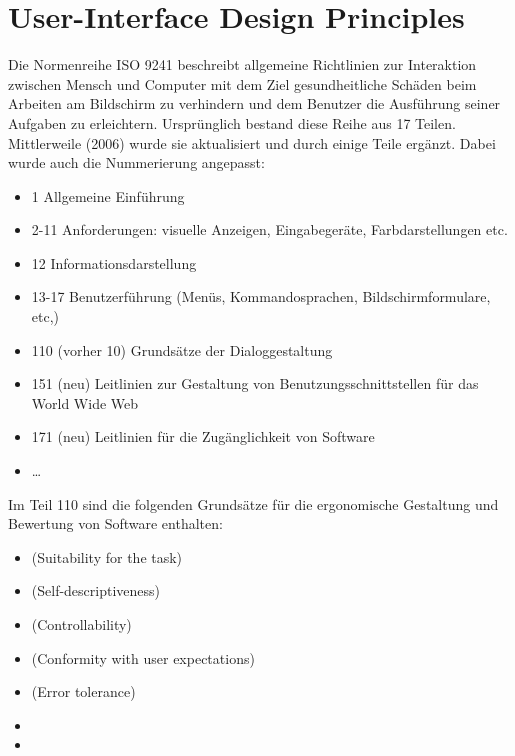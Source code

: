 \section{User-Interface Design Principles}
Die Normenreihe ISO 9241 beschreibt allgemeine Richtlinien zur Interaktion zwischen
Mensch und Computer mit dem Ziel gesundheitliche Schäden beim Arbeiten am
Bildschirm zu verhindern und dem Benutzer die Ausführung seiner Aufgaben zu
erleichtern. Ursprünglich bestand diese Reihe aus 17
Teilen. Mittlerweile (2006) wurde sie aktualisiert und durch einige
Teile ergänzt.
\newslide
Dabei wurde auch die Nummerierung angepasst:
\begin{itemize}
\item 1 Allgemeine Einführung
\item 2-11 Anforderungen: visuelle Anzeigen, Eingabegeräte,
  Farbdarstellungen etc.
\item 12 Informationsdarstellung
\item 13-17 Benutzerführung (Menüs, Kommandosprachen,
  Bildschirmformulare, etc,)
\item 110 (vorher 10) Grundsätze der Dialoggestaltung
\item 151 (neu) Leitlinien zur Gestaltung von Benutzungsschnittstellen für
  das World Wide Web
\item 171 (neu) Leitlinien für die Zugänglichkeit von Software
\item \ldots
\end{itemize}
\ifslides
\newpage
\fi
Im Teil 110 sind die folgenden Grundsätze für die ergonomische
Gestaltung und Bewertung von Software enthalten:
\ifslides
\begin{itemize}
\item {} (Suitability for the task)
\item {} (Self-descriptiveness)
\item {} (Controllability)
\item {} (Conformity with user
  expectations)
\item {} (Error tolerance)
\item {}
\item {}
\end{itemize}
\newpage
\fi

